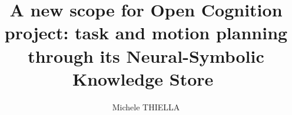 
\title{A new scope for Open Cognition project: task and motion planning through its Neural-Symbolic Knowledge Store ​}
\author{Michele THIELLA}


